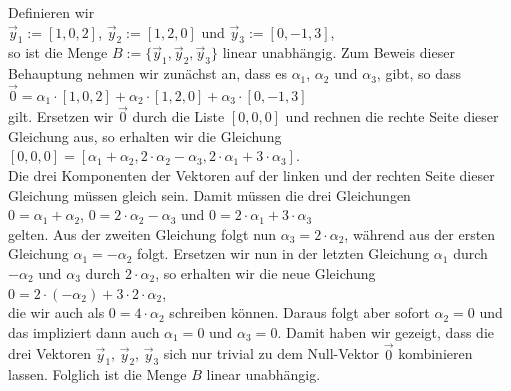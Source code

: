 \example
Definieren wir
\\[0.2cm]
\hspace*{1.3cm}
$\vec{y}_1 := [1, 0, 2]$, \quad  $\vec{y}_2 := [1, 2, 0]$ \quad und \quad $\vec{y}_3 := [0, -1, 3]$,
\\[0.2cm]
so ist die Menge $B := \{ \vec{y}_1, \vec{y}_2, \vec{y}_3 \}$
linear unabh\"{a}ngig.  Zum Beweis dieser Behauptung nehmen wir zun\"{a}chst an, dass es $\alpha_1$,
$\alpha_2$ und $\alpha_3$, gibt, so dass
\\[0.2cm]
\hspace*{1.3cm}
$\vec{0} = \alpha_1 \cdot [1,0,2] + \alpha_2 \cdot [1,2,0] + \alpha_3 \cdot [0,-1,3]$
\\[0.2cm]
gilt.  Ersetzen wir $\vec{0}$ durch die Liste $[0,0,0]$ und rechnen die rechte Seite
dieser Gleichung aus, so erhalten wir die Gleichung
\\[0.2cm]
\hspace*{1.3cm}
$[0,0,0] = [\alpha_1  + \alpha_2, 2 \cdot \alpha_2 - \alpha_3, 2 \cdot \alpha_1 + 3 \cdot \alpha_3]$.
\\[0.2cm]
Die drei Komponenten der Vektoren auf der linken und der rechten Seite dieser Gleichung m\"{u}ssen
gleich sein.  Damit m\"{u}ssen die drei Gleichungen
\\[0.2cm]
\hspace*{1.3cm}
$0 = \alpha_1 + \alpha_2$, \quad $0 = 2 \cdot \alpha_2 - \alpha_3$ \quad und \quad $0 = 2 \cdot \alpha_1 + 3 \cdot \alpha_3$
\\[0.2cm]
gelten.  Aus der zweiten Gleichung folgt nun $\alpha_3 = 2 \cdot \alpha_2$, w\"{a}hrend aus der ersten
Gleichung $\alpha_1 = - \alpha_2$ folgt.  Ersetzen wir nun in der letzten Gleichung 
$\alpha_1$ durch $-\alpha_2$ und $\alpha_3$ durch $2 \cdot \alpha_2$, so erhalten wir die neue Gleichung
\\[0.2cm]
\hspace*{1.3cm}
$0 = 2 \cdot (- \alpha_2) + 3 \cdot 2 \cdot \alpha_2$,
\\[0.2cm]
die wir auch als $0 = 4 \cdot \alpha_2$ schreiben k\"{o}nnen.  Daraus folgt aber sofort $\alpha_2 = 0$
und das impliziert dann auch $\alpha_1 = 0$ und $\alpha_3 = 0$.  Damit haben wir gezeigt, dass die drei
Vektoren $\vec{y}_1$, $\vec{y}_2$, $\vec{y}_3$ sich nur {\color{blue}trivial} zu dem Null-Vektor
$\vec{0}$ kombinieren lassen.  Folglich ist die Menge $B$ linear unabh\"{a}ngig.
\eox

